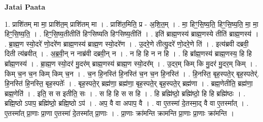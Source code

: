 \documentclass[17pt]{extarticle}
\begin{document}
\textbf{Jatai Paata} \newline

1. प्राशि॑तम् मा मा॒ प्राशि॑त॒म् प्राशि॑तम् मा । . प्राशि॑त॒मिति॒ प्र - अ॒शि॒त॒म् । . मा॒ हिꣳ॒॒सि॒ष्य॒ति॒ हिꣳ॒॒सि॒ष्य॒ति॒ मा॒ मा॒ हिꣳ॒॒सि॒ष्य॒ति॒ । . हिꣳ॒॒सि॒ष्य॒तीतीति॑ हिꣳसिष्यति हिꣳसिष्य॒तीति॑ । . इति॑ ब्राह्म॒णस्य॑ ब्राह्म॒णस्ये तीति॑ ब्राह्म॒णस्य॑ । . ब्रा॒ह्म॒ण स्यो॒दरे॑ णो॒दरे॑ण ब्राह्म॒णस्य॑ ब्राह्म॒ण स्यो॒दरे॑ण । . उ॒दरे॒णे तीत्यु॒दरे॑ णो॒दरे॒णे ति॑ । . इत्य॑ब्रवी दब्रवी॒ दिती त्य॑ब्रवीत् । . अ॒ब्र॒वी॒न् न नाब्र॑वी दब्रवी॒न् न । . न हि हि न न हि । . हि ब्रा᳚ह्म॒णस्य॑ ब्राह्म॒णस्य॒ हि हि ब्रा᳚ह्म॒णस्य॑ । . ब्रा॒ह्म॒ण स्यो॒दर॑ मु॒दर॑म् ब्राह्म॒णस्य॑ ब्राह्म॒ण स्यो॒दर᳚म् । . उ॒दर॒म् किम् कि मु॒दर॑ मु॒दर॒म् किम् । . किम् च॒न च॒न किम् किम् च॒न । . च॒न हि॒नस्ति॑ हि॒नस्ति॑ च॒न च॒न हि॒नस्ति॑ । . हि॒नस्ति॒ बृह॒स्पते॒र् बृह॒स्पतेर्॑. हि॒नस्ति॑ हि॒नस्ति॒ बृह॒स्पतेः᳚ । . बृह॒स्पते॒र् ब्रह्म॑णा॒ ब्रह्म॑णा॒ बृह॒स्पते॒र् बृह॒स्पते॒र् ब्रह्म॑णा । . ब्रह्म॒णेतीति॒ ब्रह्म॑णा॒ ब्रह्म॒णेति॑ । . इति॒ स स इतीति॒ सः । . स हि हि स स हि । . हि ब्रह्मि॑ष्ठो॒ ब्रह्मि॑ष्ठो॒ हि हि ब्रह्मि॑ष्ठः । . ब्रह्मि॒ष्ठो ऽपाप॒ ब्रह्मि॑ष्ठो॒ ब्रह्मि॒ष्ठो ऽप॑ । . अप॒ वै वा अपाप॒ वै । . वा ए॒तस्मा॑ दे॒तस्मा॒द् वै वा ए॒तस्मा᳚त् । . ए॒तस्मा᳚त् प्रा॒णाः प्रा॒णा ए॒तस्मा॑ दे॒तस्मा᳚त् प्रा॒णाः । . प्रा॒णाः क्रा॑मन्ति क्रामन्ति प्रा॒णाः प्रा॒णाः क्रा॑मन्ति । \newline
\end{document}
